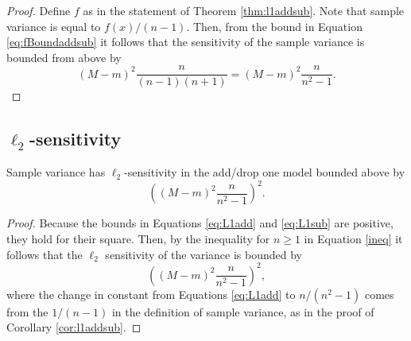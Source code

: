 \documentclass[11pt]{scrartcl} %
\begin{document}
 \begin{proof}
 Define $f$ as in the statement of Theorem \ref{thm:l1addsub}. Note that sample variance is equal to 
 $f(x)/(n-1)$. Then, from the bound in Equation \ref{eq:fBoundaddsub} it follows that the sensitivity of the sample variance is bounded from above by 
 $$ \left( M-m \right)^2 \frac{n}{(n-1)(n + 1)} = \left( M-m \right)^2 \frac{n}{n^2 - 1}. $$
 \end{proof}

\subsection{$\ell_2$-sensitivity}

\begin{theorem}
Sample variance has $\ell_2$-sensitivity in the add/drop one model bounded above by
	$$ \left( \left( M-m \right)^2 \frac{n}{n^2 - 1} \right)^2.$$
\end{theorem}
\begin{proof}
Because the bounds in Equations \ref{eq:L1add} and \ref{eq:L1sub} are positive, they hold for their square. Then, by the inequality for $n \ge 1$ in Equation \ref{ineq} it follows that the $\ell_2$ sensitivity of the variance is bounded by 
$$
\left( \left( M-m \right)^2 \frac{n}{n^2 - 1} \right)^2,
$$
where the change in constant from Equations \ref{eq:L1add} to $n/(n^2 - 1)$ comes from the $1/(n-1)$ in the definition of sample variance, as in the proof of Corollary \ref{cor:l1addsub}.
\end{proof}



\end{document}
